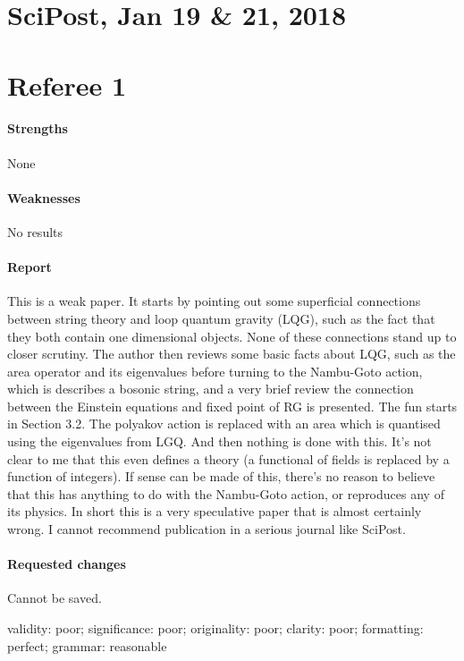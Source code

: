\documentclass[11pt]{article}
\begin{document}
\section{SciPost, Jan 19 \& 21, 2018}

\section*{Referee 1}

\paragraph{Strengths} None

\paragraph{Weaknesses} No results

\paragraph{Report} This is a weak paper. It starts by pointing out some superficial connections between string theory and loop quantum gravity (LQG), such as the fact that they both contain one dimensional objects. None of these connections stand up to closer scrutiny.
The author then reviews some basic facts about LQG, such as the area operator and its eigenvalues before turning to the Nambu-Goto action, which is describes a bosonic string, and a very brief review the connection between the Einstein equations and fixed point of RG is presented.
The fun starts in Section 3.2. The polyakov action is replaced with an area which is quantised using the eigenvalues from LGQ. And then nothing is done with this. It's not clear to me that this even defines a theory (a functional of fields is replaced by a function of integers). If sense can be made of this, there's no reason to believe that this has anything to do with the Nambu-Goto action, or reproduces any of its physics.
In short this is a very speculative paper that is almost certainly wrong. I cannot recommend publication in a serious journal like SciPost.

\paragraph{Requested changes} Cannot be saved.

validity: poor; significance: poor; originality: poor; clarity: poor; formatting: perfect; grammar: reasonable
\end{document}
